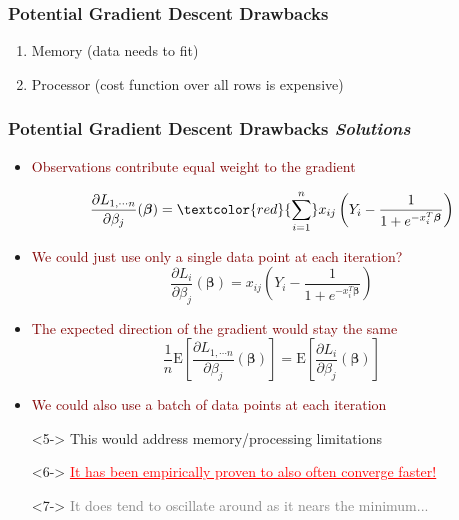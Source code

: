 \documentclass[xcolor={dvipsnames}]{beamer}
\begin{document}
\frame
{
\frametitle{Potential Gradient Descent Drawbacks}

\begin{enumerate}
\item<1-> Memory (data needs to fit)
\item<1-> Processor (cost function over all rows is expensive)
\end{enumerate}
}

\frame
{
\frametitle{Potential Gradient Descent Drawbacks \emph{Solutions}}

\begin{itemize}
\item \textcolor{Maroon}{Observations contribute equal weight to the gradient} 

$$\frac{\partial L_{1,\cdots n}}{\partial \beta_j} ({\boldsymbol \beta}) = 
\textcolor{red}{\sum_{i=1}^n} x_{ij} \left(Y_i -  \frac{1}{1+e^{-x_i^T{\boldsymbol \beta}}}  \right) $$

\item<2-> \textcolor{Maroon}{We could just use only a single data point at each iteration?} 
$$\frac{\partial L_i}{\partial \beta_j} ({\boldsymbol \beta}) = 
x_{ij} \left(Y_i -  \frac{1}{1+e^{-x_i^T{\boldsymbol \beta}}}  \right) $$

\item<3-> \textcolor{Maroon}{The expected direction of the gradient would stay the same}
$$ \frac{1}{n} \text{E}\left[\frac{\partial L_{1,\cdots n}}{\partial \beta_j} ({\boldsymbol \beta})\right] = \text{E}\left[\frac{\partial L_i}{\partial \beta_j} ({\boldsymbol \beta})\right] $$
\item<4-> \textcolor{Maroon}{We could also use a batch of data points at each iteration}
\item[]
\item[]<5-> \textcolor{NavyBlue}{This would address memory/processing limitations}
\item[]<6-> \textcolor{red}{\underline{It has been empirically proven to also often converge faster!}}
\item[]<7-> \textcolor{gray}{It does tend to oscillate around as it nears the minimum...}
\item[]
\end{itemize}
}
\end{document}
